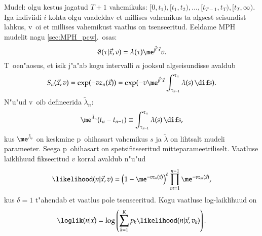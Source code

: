 \documentclass[a4paper]{article}
\numberwithin{equation}{subsection}
\begin{document}
Mudel: olgu kestus jagatud $T+1$ vahemikuks: $[0, t_1), [t_1, t_2),
\dots, [t_{T-1}, t_T), [t_T, \infty)$.  Iga indiviidi $i$ kohta olgu
vaadeldav et millises vahemikus ta algsest seisundist lahkus, v~oi et
millises vahemikust vaatlus on tsenseeritud.  Eeldame MPH mudelit nagu
\ref{sec:MPH_pcw}.~{}osas:
\begin{equation}
  \label{eq:MPH}
  \vartheta(\tau|\vec{x}, v) = \lambda(\tau) \me^{\vec{\beta}'\vec{x}} v.
\end{equation}
T~oen"aosus, et isik j"a"ab kogu intervalli $n$ jooksul algseisundisse
avaldub 
\begin{equation}
  S_n(\vec{x}, v) = \exp(-v z_n(\vec{x})) = 
  \exp(-v \me^{\vec{\beta}'\vec{x}} 
  \int_{\tau_{n-1}}^{\tau_n} \lambda(s) \,\dif s).
\end{equation}
N"u"ud v~oib defineerida $\tilde\lambda_n$:
\begin{equation}
  \me^{\tilde\lambda_n}(t_n - t_{n-1})
  \equiv \int_{\tau_{n-1}}^{\tau_n} \lambda(s) \,\dif s,
\end{equation}
kus $\me^{\tilde\lambda_s}$ on keskmine p~ohihasart vahemikus $s$ ja
$\tilde\lambda$ on lihtsalt mudeli parameeter.  Seega p~ohihasart on
spetsifitseeritud mitteparameetriliselt.  Vaatluse laiklihuud
fikseeritud $v$ korral avaldub
n"u"ud
\begin{equation}
  \likelihood(n|\vec{x}, v) =
  \left(
    1 - \me^{-v z_n(\vec{x})}
  \right)^\delta
  \prod_{m=1}^{n-1} \me^{-v z_m(\vec{x})},
\end{equation}
kus $\delta=1$ t"ahendab et vaatlus pole tsenseeritud.  Kogu vaatluse
log-laiklihuud on 
\begin{equation}
  \loglik(n|\vec{x}) = 
  \log\left(
    \sum_{k=1}^K p_k \likelihood(n|\vec{x}, v_k) \right).
\end{equation}
\end{document}
